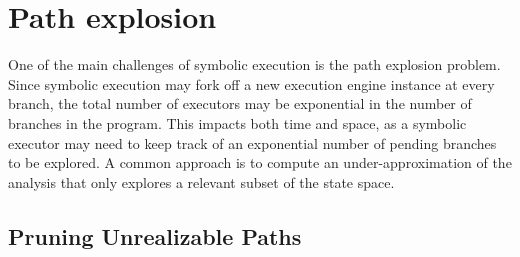 
\section{Path explosion}
\label{se:path-explosion}

One of the main challenges of symbolic execution is the path explosion problem. Since symbolic execution may fork off a new execution engine instance at every branch, the total number of executors may be exponential in the number of branches in the program. This impacts both time and space, as a symbolic executor may need to keep track of an exponential number of pending branches to be explored. A common approach is to compute an under-approximation of the analysis that only explores a relevant subset of the state space.

\subsection{Pruning Unrealizable Paths}
\label{ss:unrealizable-paths}

